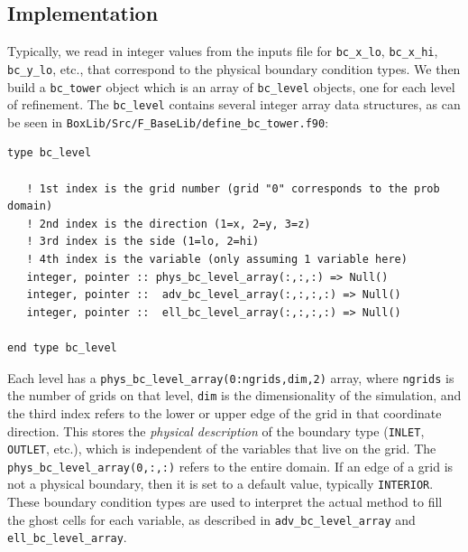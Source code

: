 \subsection{Implementation}
Typically, we read in integer values from the inputs file for {\tt bc\_x\_lo}, 
{\tt bc\_x\_hi}, {\tt bc\_y\_lo}, etc., that correspond to the physical boundary condition types.
We then build a {\tt bc\_tower} object which is an array of {\tt bc\_level} objects, one for
each level of refinement.  The {\tt bc\_level} contains several integer array data structures,
as can be seen in {\tt BoxLib/Src/F\_BaseLib/define\_bc\_tower.f90}:
\begin{lstlisting}[backgroundcolor=\color{light-green}]
type bc_level

   ! 1st index is the grid number (grid "0" corresponds to the prob domain)
   ! 2nd index is the direction (1=x, 2=y, 3=z)
   ! 3rd index is the side (1=lo, 2=hi)
   ! 4th index is the variable (only assuming 1 variable here)
   integer, pointer :: phys_bc_level_array(:,:,:) => Null()
   integer, pointer ::  adv_bc_level_array(:,:,:,:) => Null()
   integer, pointer ::  ell_bc_level_array(:,:,:,:) => Null()

end type bc_level
\end{lstlisting}
Each level has a {\tt phys\_bc\_level\_array(0:ngrids,dim,2)} array, where {\tt ngrids} is the number of
grids on that level, {\tt dim} is the dimensionality of the simulation, and the third index refers to
the lower or upper edge of the grid in that coordinate direction.  This stores the {\it physical description}
of the boundary type ({\tt INLET}, {\tt OUTLET}, etc.), which is independent of the variables that live on
the grid.  The {\tt phys\_bc\_level\_array(0,:,:)} refers to the entire domain.  If an edge of a grid is not
a physical boundary, then it is set to a default value, typically {\tt INTERIOR}.  These boundary condition
types are used to interpret the actual method to fill the ghost cells for each variable, as described
in {\tt adv\_bc\_level\_array} and {\tt ell\_bc\_level\_array}.


